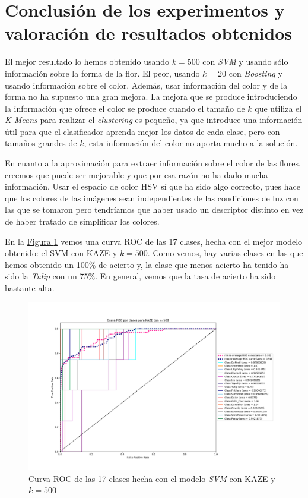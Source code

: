 \documentclass[paper=a4, fontsize=11pt]{article} %
\numberwithin{equation}{section} %
\numberwithin{figure}{section} %
\numberwithin{table}{section} %
\begin{document}
\section{Conclusión de los experimentos y valoración de resultados obtenidos}
El mejor resultado lo hemos obtenido usando $k=500$ con \textit{SVM} y usando sólo información sobre la forma de la flor. El peor, usando $k=20$ con \textit{Boosting} y usando información sobre el color. Además, usar información del color y de la forma no ha supuesto una gran mejora. La mejora que se produce introduciendo la información que ofrece el color se produce cuando el tamaño de $k$ que utiliza el \textit{K-Means} para realizar el \textit{clustering} es pequeño, ya que introduce una información útil para que el clasificador aprenda mejor los datos de cada clase, pero con tamaños grandes de $k$, esta información del color no aporta mucho a la solución.

En cuanto a la aproximación para extraer información sobre el color de las flores, creemos que puede ser mejorable y que por esa razón no ha dado mucha información. Usar el espacio de color HSV sí que ha sido algo correcto, pues hace que los colores de las imágenes sean independientes de las condiciones de luz con las que se tomaron pero tendríamos que haber usado un descriptor distinto en vez de haber tratado de simplificar los colores.

En la \hyperref[roc]{Figura \ref*{roc}} vemos una curva ROC de las 17 clases, hecha con el mejor modelo obtenido: el SVM con KAZE y $k=500$. Como vemos, hay varias clases en las que hemos obtenido un 100\% de acierto y, la clase que menos acierto ha tenido ha sido la \textit{Tulip} con un 75\%. En general, vemos que la tasa de acierto ha sido bastante alta.

\begin{figure}[!h]
  \centering
  \includegraphics[width=\textwidth]{img/shapekaze_500}
  \caption{Curva ROC de las 17 clases hecha con el modelo \textit{SVM} con KAZE y $k=500$}
  \label{roc}
\end{figure}
\end{document}

